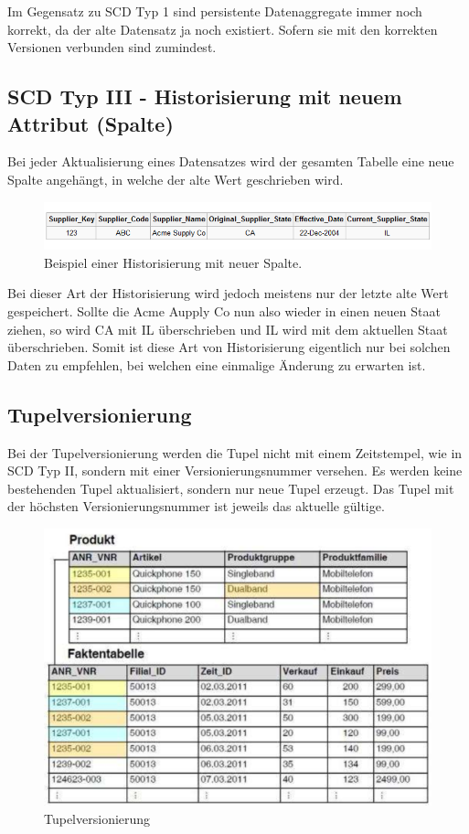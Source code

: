 \documentclass[a4paper, 11pt, nofootinbib]{article}
\begin{document}
\noindent Im Gegensatz zu SCD Typ 1 sind persistente Datenaggregate immer noch korrekt, da der alte Datensatz ja noch existiert. Sofern sie mit den korrekten Versionen verbunden sind zumindest.


\subsection{SCD Typ III - Historisierung mit neuem Attribut (Spalte)}
Bei jeder Aktualisierung eines Datensatzes wird der gesamten Tabelle eine neue Spalte angehängt, in welche der alte Wert geschrieben wird.

\begin{figure}[htb]
	\centering
	\includegraphics[keepaspectratio=true,height=4.5\baselineskip]{scd_type3.png}
	\caption{Beispiel einer Historisierung mit neuer Spalte.}
	\label{fig:scd3}
\end{figure}

Bei dieser Art der Historisierung wird jedoch meistens nur der letzte alte Wert gespeichert. Sollte die Acme Aupply Co nun also wieder in einen neuen Staat ziehen, so wird CA mit IL überschrieben und IL wird mit dem aktuellen Staat überschrieben. Somit ist diese Art von Historisierung eigentlich nur bei solchen Daten zu empfehlen, bei welchen eine einmalige Änderung zu erwarten ist.

\subsection{Tupelversionierung}
Bei der Tupelversionierung werden die Tupel nicht mit einem Zeitstempel, wie in SCD Typ II, sondern mit einer Versionierungsnummer versehen. Es werden keine bestehenden Tupel aktualisiert, sondern nur neue Tupel erzeugt. Das Tupel mit der höchsten Versionierungsnummer ist jeweils das aktuelle gültige.

\begin{figure}[htb!]
	\centering
	\includegraphics[keepaspectratio=true,height=17\baselineskip]{tupelversionierung.PNG}
	\caption{Tupelversionierung}
	\label{fig:tupel}
\end{figure}
\end{document}
